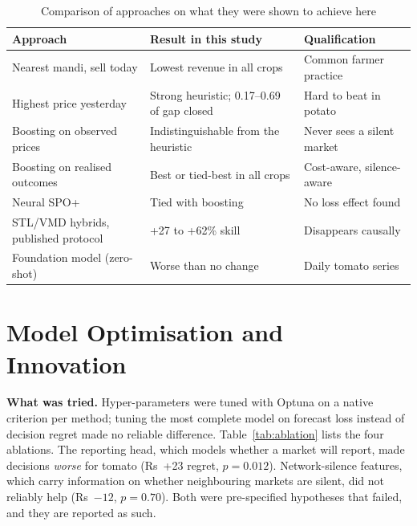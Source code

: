 \begin{table}[!t]
\centering
\caption{Comparison of approaches on what they were shown to achieve here}
\label{tab:comparative}
\small
\begin{tabular}{|p{4.3cm}|p{5.2cm}|p{4.9cm}|}
\hline
\textbf{Approach} & \textbf{Result in this study} & \textbf{Qualification} \\ \hline
Nearest mandi, sell today & Lowest revenue in all crops & Common farmer practice \\ \hline
Highest price yesterday & Strong heuristic; 0.17--0.69 of gap closed & Hard to beat in potato \\ \hline
Boosting on observed prices & Indistinguishable from the heuristic & Never sees a silent market \\ \hline
Boosting on realised outcomes & Best or tied-best in all crops & Cost-aware, silence-aware \\ \hline
Neural SPO+ & Tied with boosting & No loss effect found \\ \hline
STL/VMD hybrids, published protocol & +27 to +62\% skill & Disappears causally \\ \hline
Foundation model (zero-shot) & Worse than no change & Daily tomato series \\ \hline
\end{tabular}
\end{table}

\section{Model Optimisation and Innovation}
\label{sec:model-optimization}

\noindent\textbf{What was tried.} Hyper-parameters were tuned with Optuna on a native criterion per method; tuning the most complete model on forecast loss instead of decision regret made no reliable difference. Table~\ref{tab:ablation} lists the four ablations. The reporting head, which models whether a market will report, made decisions \emph{worse} for tomato (Rs~+23 regret, $p=0.012$). Network-silence features, which carry information on whether neighbouring markets are silent, did not reliably help (Rs~$-12$, $p=0.70$). Both were pre-specified hypotheses that failed, and they are reported as such.

\begin{table}[!t]
\centering
\caption{Ablations: change in regret (negative is better) with Holm-adjusted $p$}
\label{tab:ablation}
\end{table}

